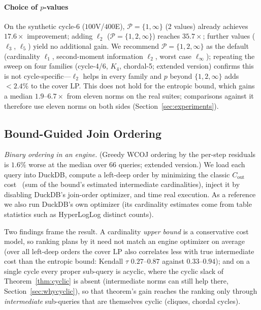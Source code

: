 \documentclass[sigconf, nonacm, acmthm=false]{acmart}
\begin{document}
\paragraph{Choice of $p$-values}
On the synthetic cycle-6 ($100$V/$400$E), $\mathcal{P} = \{1,\infty\}$ (2 values) already
achieves $17.6\times$ improvement; adding $\ell_2$ ($\mathcal{P} =
\{1,2,\infty\}$) reaches $35.7\times$; further values ($\ell_3$,
$\ell_5$) yield no additional gain.
We recommend $\mathcal{P} = \{1, 2, \infty\}$ as the default (cardinality
$\ell_1$, second-moment information $\ell_2$, worst case $\ell_\infty$); repeating the
sweep on four families (cycle-4/6, $K_4$, chordal-5; extended version) confirms this is not
cycle-specific---$\ell_2$ helps in every family and $p$ beyond
$\{1,2,\infty\}$ adds $<2.4\%$ to the cover LP. This does not hold for
the entropic bound, which gains a median $1.9$--$6.7\times$ from eleven norms
on the real suites; comparisons against it therefore use eleven norms on
both sides (Section~\ref{sec:experiments}).



\subsection{Bound-Guided Join Ordering}
\label{sec:robustness}\label{sec:wcoj}

\emph{Binary ordering in an engine.} (Greedy WCOJ ordering by the per-step residuals is $1.6\%$ worse at the median over $66$ queries; extended version.) We load each query into DuckDB, compute a
left-deep order by minimizing the classic $C_{\mathrm{out}}$
cost~\cite{cluet1995complexity} (sum of the bound's estimated intermediate
cardinalities), inject it by disabling DuckDB's join-order optimizer, and
time real execution. As a reference we also run DuckDB's own optimizer
(its cardinality estimates come from table statistics such as
HyperLogLog distinct counts).

Two findings frame the result. A cardinality \emph{upper bound} is a
conservative cost model, so ranking plans by it need not match an engine
optimizer on average (over all left-deep orders the cover LP also
correlates less with true intermediate cost than the entropic bound:
Kendall $\tau$ $0.27$--$0.87$ against $0.33$--$0.94$); and on a single
cycle every proper sub-query is acyclic, where the cyclic slack of
Theorem~\ref{thm:cyclic} is absent (intermediate norms can still help there,
Section~\ref{sec:whycyclic}), so that theorem's gain reaches the ranking only
through \emph{intermediate} sub-queries that are themselves cyclic (cliques, chordal cycles).
\end{document}

